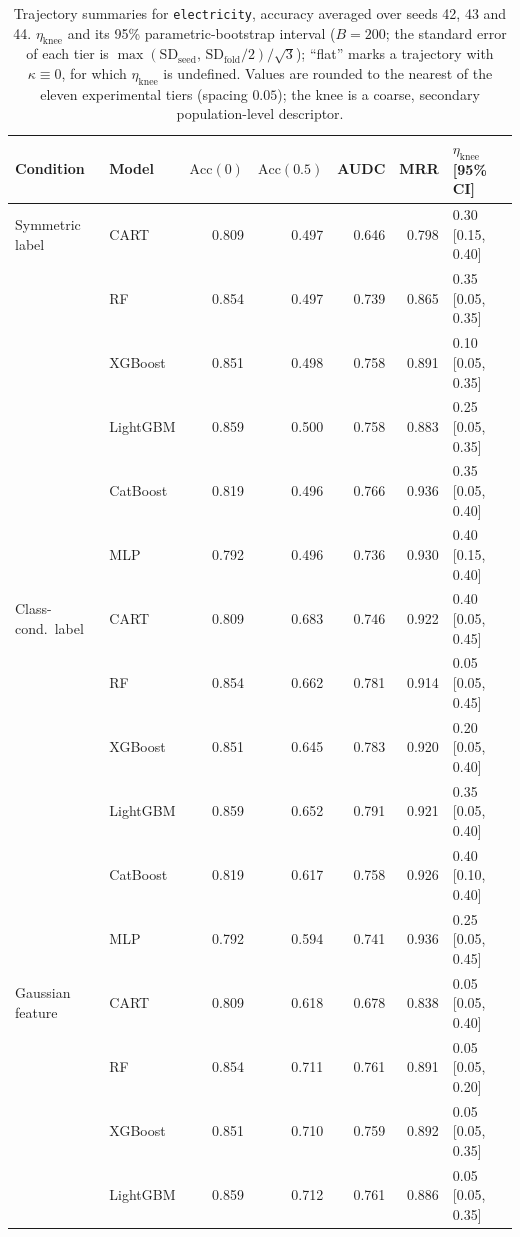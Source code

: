 \documentclass[pdflatex,sn-mathphys]{sn-jnl}
\theoremstyle{thmstyleone}
\begin{document}
\begin{table}[htbp]
\centering
\scriptsize
\setlength{\tabcolsep}{3.5pt}
\caption{Trajectory summaries for \texttt{electricity}, accuracy averaged over seeds 42, 43 and 44. $\eta_{\mathrm{knee}}$ and its 95\% parametric-bootstrap interval ($B=200$; the standard error of each tier is $\max(\mathrm{SD}_{\mathrm{seed}},\,\mathrm{SD}_{\mathrm{fold}}/2)/\sqrt3$); ``flat'' marks a trajectory with $\kappa\equiv 0$, for which $\eta_{\mathrm{knee}}$ is undefined. Values are rounded to the nearest of the eleven experimental tiers (spacing $0.05$); the knee is a coarse, secondary population-level descriptor.}
\label{tab:traj_electricity}
\begin{tabular}{@{}llrrrrl@{}}
\toprule
Condition & Model & $\mathrm{Acc}(0)$ & $\mathrm{Acc}(0.5)$ & AUDC & MRR & $\eta_{\mathrm{knee}}$ [95\% CI] \\
\midrule
Symmetric label & CART & 0.809 & 0.497 & 0.646 & 0.798 & 0.30 [0.15, 0.40] \\
 & RF & 0.854 & 0.497 & 0.739 & 0.865 & 0.35 [0.05, 0.35] \\
 & XGBoost & 0.851 & 0.498 & 0.758 & 0.891 & 0.10 [0.05, 0.35] \\
 & LightGBM & 0.859 & 0.500 & 0.758 & 0.883 & 0.25 [0.05, 0.35] \\
 & CatBoost & 0.819 & 0.496 & 0.766 & 0.936 & 0.35 [0.05, 0.40] \\
 & MLP & 0.792 & 0.496 & 0.736 & 0.930 & 0.40 [0.15, 0.40] \\
\midrule
Class-cond.\ label & CART & 0.809 & 0.683 & 0.746 & 0.922 & 0.40 [0.05, 0.45] \\
 & RF & 0.854 & 0.662 & 0.781 & 0.914 & 0.05 [0.05, 0.45] \\
 & XGBoost & 0.851 & 0.645 & 0.783 & 0.920 & 0.20 [0.05, 0.40] \\
 & LightGBM & 0.859 & 0.652 & 0.791 & 0.921 & 0.35 [0.05, 0.40] \\
 & CatBoost & 0.819 & 0.617 & 0.758 & 0.926 & 0.40 [0.10, 0.40] \\
 & MLP & 0.792 & 0.594 & 0.741 & 0.936 & 0.25 [0.05, 0.45] \\
\midrule
Gaussian feature & CART & 0.809 & 0.618 & 0.678 & 0.838 & 0.05 [0.05, 0.40] \\
 & RF & 0.854 & 0.711 & 0.761 & 0.891 & 0.05 [0.05, 0.20] \\
 & XGBoost & 0.851 & 0.710 & 0.759 & 0.892 & 0.05 [0.05, 0.35] \\
 & LightGBM & 0.859 & 0.712 & 0.761 & 0.886 & 0.05 [0.05, 0.35] \\

\end{tabular}
\end{table}
\end{document}
